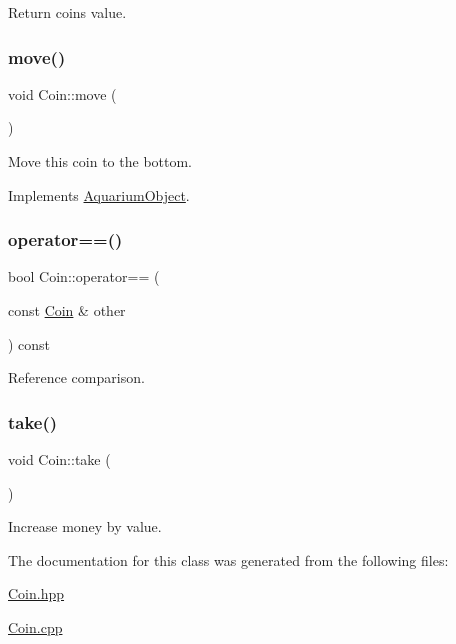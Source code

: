 Return coin\textquotesingle{}s value. 

\mbox{\label{class_coin_ab62bca5834489b9b483deaa3ca3470e9}} 
\subsubsection{\texorpdfstring{move()}{move()}}
{\footnotesize\ttfamily void Coin\+::move (\begin{DoxyParamCaption}{ }\end{DoxyParamCaption})\hspace{0.3cm}{\ttfamily [virtual]}}



Move this coin to the bottom. 



Implements \mbox{\hyperlink{class_aquarium_object_a42c4de640f89ac8aebc26b7618578575}{Aquarium\+Object}}.

\mbox{\label{class_coin_a803072934a3da4010352955208e14c4e}} 
\subsubsection{\texorpdfstring{operator==()}{operator==()}}
{\footnotesize\ttfamily bool Coin\+::operator== (\begin{DoxyParamCaption}\item[{const \mbox{\hyperlink{class_coin}{Coin}} \&}]{other }\end{DoxyParamCaption}) const}



Reference comparison. 

\mbox{\label{class_coin_abdc8520a89656c688cc70cffa14265ca}} 
\subsubsection{\texorpdfstring{take()}{take()}}
{\footnotesize\ttfamily void Coin\+::take (\begin{DoxyParamCaption}{ }\end{DoxyParamCaption})}



Increase money by value. 



The documentation for this class was generated from the following files\+:\begin{DoxyCompactItemize}
\item 
\mbox{\hyperlink{_coin_8hpp}{Coin.\+hpp}}\item 
\mbox{\hyperlink{_coin_8cpp}{Coin.\+cpp}}\end{DoxyCompactItemize}

